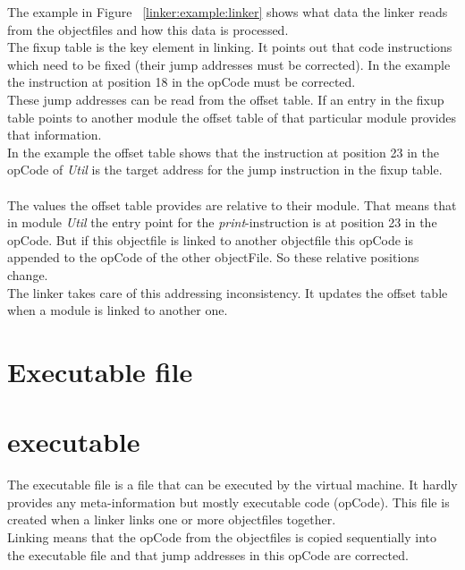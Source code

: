 The example in Figure ~\ref{linker:example:linker} shows what data the linker reads
from the objectfiles and how this data is processed. \\
The fixup table is the key element in linking. It points out that code
instructions which need to be fixed (their jump addresses must be corrected).
In the example the instruction at position 18 in the opCode must be corrected. \\
These jump addresses can be read from the offset table. If an entry in the fixup
table points to another module the offset table of that particular module
provides that information.  \\
In the example the offset table shows that the instruction at position 23 in the
opCode of \emph{Util} is the target address for the jump instruction in the
fixup table. \\
\\
The values the offset table provides are relative to their module. That means
that in module \emph{Util} the entry point for the \emph{print}-instruction is
at position 23 in the opCode. But if this objectfile is linked to another
objectfile this opCode is appended to the opCode of the other objectFile. So
these relative positions change. \\
The linker takes care of this addressing inconsistency. It updates the offset
table when a module is linked to another one. 


\section{Executable file}
\section{executable}
The executable file is a file that can be executed by the virtual machine. It hardly
provides any meta-information but mostly executable code (opCode). This file is
created when a linker links one or more objectfiles together. \\
Linking means that the opCode from the objectfiles is copied sequentially into the
executable file and that jump addresses in this opCode are corrected. 

